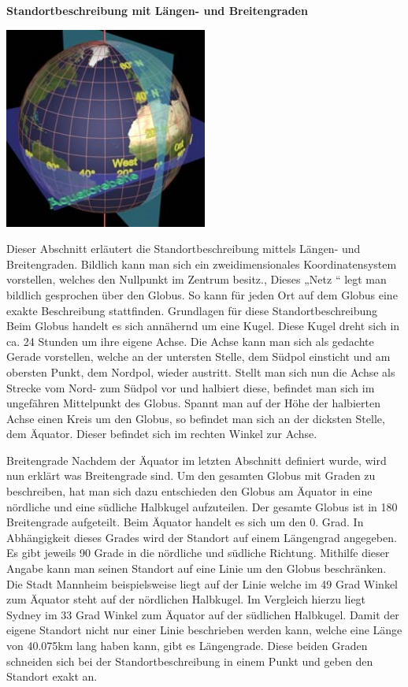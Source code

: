 \textbf{Standortbeschreibung mit Längen- und Breitengraden}

\includegraphics[width=0.50\textwidth]{ref/images/grade.jpg}

Dieser Abschnitt erläutert die Standortbeschreibung mittels Längen- und Breitengraden.
Bildlich kann man sich ein zweidimensionales Koordinatensystem vorstellen, welches den Nullpunkt im Zentrum besitz., Dieses „Netz “ legt man bildlich gesprochen über den Globus. So kann für jeden Ort auf dem Globus eine exakte Beschreibung stattfinden. 
Grundlagen für diese Standortbeschreibung
Beim Globus handelt es sich annähernd um eine Kugel. Diese Kugel dreht sich in ca. 24 Stunden um ihre eigene Achse. Die Achse kann man sich als gedachte Gerade vorstellen, welche an der untersten Stelle, dem Südpol einsticht und am obersten Punkt, dem Nordpol, wieder austritt. Stellt man sich nun die Achse als Strecke vom Nord- zum Südpol vor und halbiert diese, befindet man sich im ungefähren Mittelpunkt des Globus. Spannt man auf der Höhe der halbierten Achse einen Kreis um den Globus, so befindet man sich an der dicksten Stelle, dem Äquator. Dieser befindet sich im rechten Winkel zur Achse.

Breitengrade
Nachdem der Äquator im letzten Abschnitt definiert wurde, wird nun erklärt was Breitengrade sind. Um den gesamten Globus mit Graden zu beschreiben, hat man sich dazu entschieden den Globus am Äquator in eine nördliche und eine südliche Halbkugel aufzuteilen. Der gesamte Globus ist in 180 Breitengrade aufgeteilt. Beim Äquator handelt es sich um den 0. Grad. In Abhängigkeit dieses Grades wird der Standort auf einem Längengrad angegeben. Es gibt jeweils 90 Grade in die nördliche und südliche Richtung. Mithilfe dieser Angabe kann man seinen Standort auf eine Linie um den Globus beschränken. Die Stadt Mannheim beispielsweise liegt auf der Linie welche im 49 Grad Winkel zum Äquator steht auf der nördlichen Halbkugel. Im Vergleich hierzu liegt Sydney im 33 Grad Winkel zum Äquator auf der südlichen Halbkugel.
Damit der eigene Standort nicht nur einer Linie beschrieben werden kann, welche eine Länge von 40.075km lang haben kann, gibt es Längengrade. Diese beiden Graden schneiden sich bei der Standortbeschreibung in einem Punkt und geben den Standort exakt an.

